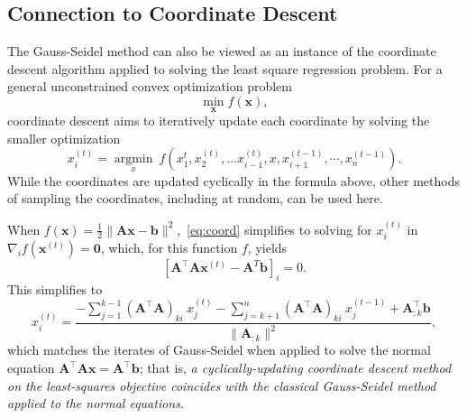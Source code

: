 \documentclass[10.5pt]{amsart}
\newcommand{\mat}[1]{\bm{#1}}
\def\vb{{\bm{b}}}
\def\vx{{\bm{x}}}
\begin{document}
\subsection{Connection to Coordinate Descent}

The Gauss-Seidel method can also be viewed as an instance of the coordinate descent algorithm applied to solving the least square regression problem. For a general unconstrained convex optimization problem 
$$ \underset{\vx}{\min} f(\vx), $$
coordinate descent aims to iteratively update each coordinate by solving the smaller  optimization
\begin{equation}
\label{eq:coord}x_i^{(t)} = \underset{x}{\text{arg} \min} \ f(x_1^{t}, x_2^{(t)}, \dots x_{i-1}^{(t)}, x , x_{i+1}^{(t-1)}, \cdots, x_{n}^{(t-1)}).\end{equation}
While the coordinates are updated cyclically in the formula above, other methods of sampling the coordinates, including at random, can be used here. 

When $f(\vx) = \frac{1}{2} \|\mat{A}\vx-\vb\|^2$,~\eqref{eq:coord} simplifies to solving for $x_i^{(t)}$ in $\nabla_i f(\vx^{(t)}) = \bm{0}$, which, for this function $f$, yields
$$\left[\mat{A}^\top \mat{A}\vx^{(t)} - \mat{A}^T \vb \right]_i = 0. $$
This simplifies to 
$$x_i^{(t)} = \frac{-\sum_{j=1}^{k-1} (\mat{A}^\top \mat{A})_{ki} \  x_j^{(t)} - \sum_{j=k+1}^{n} (\mat{A}^\top \mat{A})_{ki} \  x_j^{(t-1)} + \mat{A}_{:k}^\top \vb}{\|\mat{A}_{:k}\|^2},$$
which matches the iterates of Gauss-Seidel when applied to solve the normal equation $\mat{A}^\top \mat{A}\vx = \mat{A}^\top\vb$; that is, \emph{a cyclically-updating coordinate descent method on the least-squares objective coincides with the classical Gauss-Seidel method applied to the normal equations}.
\end{document}
